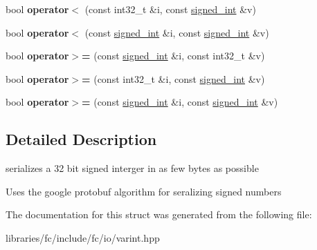 \begin{DoxyCompactItemize}
\mbox{\label{structfc_1_1signed__int_ae0ebf886eb4f8bd58f41626bfc2d88b7}} 
bool {\bfseries operator$<$} (const int32\+\_\+t \&i, const \mbox{\hyperlink{structfc_1_1signed__int}{signed\+\_\+int}} \&v)
\item 
\mbox{\label{structfc_1_1signed__int_ac2eea5a817b5774997100c0cdb8c81d2}} 
bool {\bfseries operator$<$} (const \mbox{\hyperlink{structfc_1_1signed__int}{signed\+\_\+int}} \&i, const \mbox{\hyperlink{structfc_1_1signed__int}{signed\+\_\+int}} \&v)
\item 
\mbox{\label{structfc_1_1signed__int_a0b7eb30fe9fdbc1f375309719ad8248c}} 
bool {\bfseries operator$>$=} (const \mbox{\hyperlink{structfc_1_1signed__int}{signed\+\_\+int}} \&i, const int32\+\_\+t \&v)
\item 
\mbox{\label{structfc_1_1signed__int_accb4bcf54dbdec11cdcbd06167d677c9}} 
bool {\bfseries operator$>$=} (const int32\+\_\+t \&i, const \mbox{\hyperlink{structfc_1_1signed__int}{signed\+\_\+int}} \&v)
\item 
\mbox{\label{structfc_1_1signed__int_ab249950f493a3623cf845633e07df502}} 
bool {\bfseries operator$>$=} (const \mbox{\hyperlink{structfc_1_1signed__int}{signed\+\_\+int}} \&i, const \mbox{\hyperlink{structfc_1_1signed__int}{signed\+\_\+int}} \&v)
\end{DoxyCompactItemize}


\subsection{Detailed Description}
serializes a 32 bit signed interger in as few bytes as possible 

Uses the google protobuf algorithm for seralizing signed numbers 

The documentation for this struct was generated from the following file\+:\begin{DoxyCompactItemize}
\item 
libraries/fc/include/fc/io/varint.\+hpp\end{DoxyCompactItemize}
